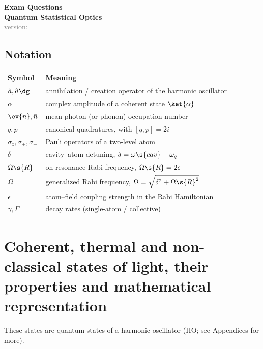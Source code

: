 \documentclass[fontsize=9pt,bookmarkpackage=false]{scrartcl}
\begin{document}

  {
    \centering
    \textbf{\LARGE Exam Questions\\
      Quantum Statistical Optics
    }
    \\ \textcolor{gray}{\footnotesize version:\DTMNow }
    \par
  }

  \bigskip


  {\footnotesize
  \tableofcontents
}

\subsection*{Notation}%
\label{sec:notation}

\begin{center}
\begin{tabular}{ll}
\toprule
Symbol & Meaning \\
\midrule
$\hat a,\hat a\dg$ & annihilation / creation operator of the harmonic oscillator \\
$\alpha$ & complex amplitude of a coherent state $\ket{\alpha}$ \\
$\ev{n},\bar n$ & mean photon (or phonon) occupation number \\
$q,p$ & canonical quadratures, with $[q,p]=2i$ \\
$\sigma_z,\sigma_+,\sigma_-$ & Pauli operators of a two-level atom \\
$\delta$ & cavity--atom detuning, $\delta=\omega\s{cav}-\omega_q$ \\
$\Omega\s{R}$ & on-resonance Rabi frequency, $\Omega\s{R}=2\epsilon$ \\
$\Omega$ & generalized Rabi frequency, $\Omega=\sqrt{\delta^2+\Omega\s{R}^2}$ \\
$\epsilon$ & atom--field coupling strength in the Rabi Hamiltonian \\
$\gamma,\Gamma$ & decay rates (single-atom / collective) \\
\bottomrule
\end{tabular}
\end{center}

\section{Coherent, thermal and non-classical states of light, their properties and mathematical representation}%

These states are quantum states of a harmonic oscillator (HO; see Appendices for more).
\end{document}
